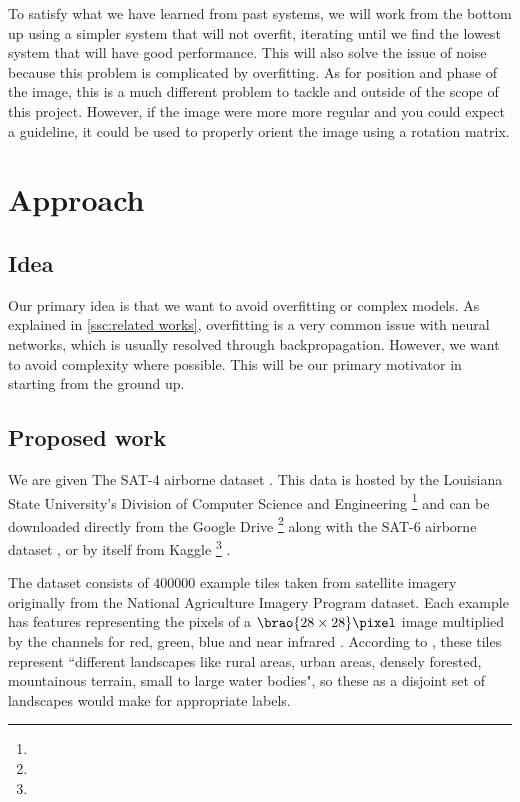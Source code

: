 \documentclass[11pt]{report}
\DeclarePairedDelimiter\brao()%
\begin{document}
To satisfy what we have learned from past systems,
we will work from the bottom up using a simpler system that will not overfit,
iterating until we find the lowest system that will have good performance.
This will also solve the issue of noise because this problem is complicated by overfitting.
As for position and phase of the image, this is a much different problem to tackle and outside of the scope of this project.
However, if the image were more more regular and you could expect a guideline,
it could be used to properly orient the image using a rotation matrix.

\section{Approach}

\subsection{Idea}

Our primary idea is that we want to avoid overfitting or complex models.
As explained in \ref{ssc:related works},
overfitting is a very common issue with neural networks,
which is usually resolved through backpropagation.
However, we want to avoid complexity where possible.
This will be our primary motivator in starting from the ground up.

\subsection{Proposed work}

We are given
The SAT-4 airborne dataset%
\cite{Basu2015a}.
This data is hosted by the Louisiana State University's Division of Computer Science and Engineering%
\footnote{%
}
and can be downloaded directly from the Google Drive%
\footnote{%
}
along with the SAT-6 airborne dataset%
, or by itself from Kaggle%
\footnote{%
}%
.

The dataset consists of \(\num{400000}\) example tiles
taken from satellite imagery originally from the National Agriculture Imagery Program  dataset.
Each example has features representing the pixels of a \(\SI[parse-numbers=false]{\brao{28\times28}\!}\pixel\) image 
multiplied by the channels for red, green, blue and near infrared .
According to \textcite{Basu2015a},
these tiles represent ``different landscapes like rural areas, urban areas, densely forested, mountainous terrain, small to large water bodies",
so these as a disjoint set of landscapes would make for appropriate labels.
\end{document}
